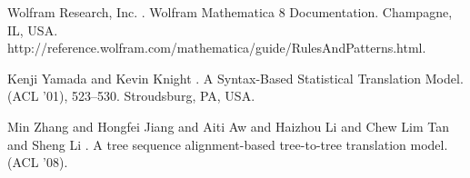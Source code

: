 \documentclass[11pt]{article}
\begin{document}
\begin{thebibliography}{}
Wolfram Research, Inc.
.
\newblock Wolfram Mathematica 8 Documentation.
\newblock Champagne, IL, USA.
\newblock http://reference.wolfram.com/mathematica/guide/RulesAndPatterns.html.

Kenji Yamada and Kevin Knight
.
\newblock A Syntax-Based Statistical Translation Model.
 (ACL '01), 523--530.
\newblock Stroudsburg, PA, USA.


Min Zhang and Hongfei Jiang and Aiti Aw and Haizhou Li and Chew Lim Tan and Sheng Li
.
\newblock A tree sequence alignment-based tree-to-tree translation model.
 (ACL '08).


\end{thebibliography}
\end{document}
